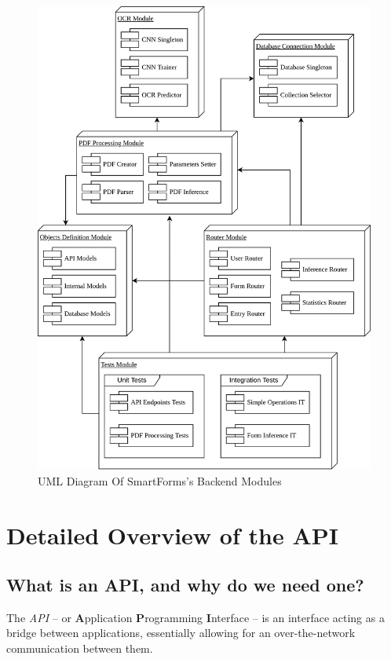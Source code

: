 \documentclass[11pt, a4paper]{report}
\begin{document}
\begin{figure}[!h]
	\centering
	\includegraphics[width=37em]{images/diagrams/ProjectModulesDiagram.png}
	\caption{UML Diagram Of SmartForms's Backend Modules}
	\label{smart-forms-modules}
\end{figure}


\chapter{Detailed Overview of the API}
\label{chapter-detailed-overview-of-the-api}

\section{What is an API, and why do we need one?}

The \textit{API} -- or \textbf{A}pplication \textbf{P}rogramming \textbf{I}nterface -- is an interface acting as a bridge between applications, essentially allowing for an over-the-network communication between them.
\end{document}
